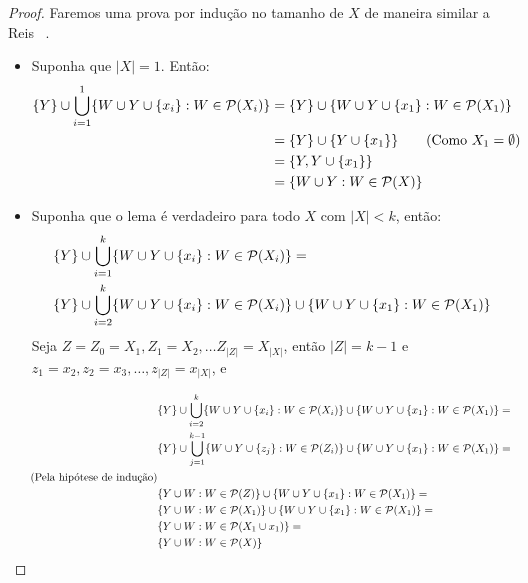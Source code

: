 \begin{proof}
Faremos uma prova por indução no tamanho de $X$ de maneira similar a
Reis ~\cite{Rei12}.

\begin{itemize}
\item{Suponha que $|X| = 1$. Então:}
\begin{align*}
    \{Y\} \cup \bigcup_{i = 1}^{1} \{W \cup Y \cup \{x_i\} : W \in \mathcal{P} (X_i)\} & = 
    \{Y\} \cup \{W \cup Y \cup \{x_1\} : W \in \mathcal{P} (X_1)\} & \\
    & = \{Y\} \cup \{Y \cup \{x_1\}\} \tag{Como $X_1 = \emptyset$} \\
    & = \{Y, Y \cup \{x_1\}\} \\
    & = \{W \cup Y : W \in \mathcal{P} (X)\}
\end{align*}

\item{Suponha que o lema é verdadeiro para todo $X$ com $|X| < k$, 
    então:}
\begin{align*}
    & \{Y\} \cup \bigcup_{i = 1}^{k} \{W \cup Y \cup \{x_i\} : W \in \mathcal{P} (X_i)\} = \\
    & \{Y\} \cup \bigcup_{i = 2}^{k} \{W \cup Y \cup \{x_i\} : W \in \mathcal{P} (X_i)\} \cup \{W \cup Y \cup \{x_1\} : W \in \mathcal{P} (X_1) \}\\
\end{align*}
Seja $Z = Z_0 = X_1, Z_1 = X_2, \dots Z_{|Z|} = X_{|X|}$, então
$|Z| = k - 1$ e $z_1 = x_2, z_2 = x_3, \dots, z_{|Z|} = x_{|X|}$, e
\end{itemize}

\begin{align*}
    & \{Y\} \cup \bigcup_{i = 2}^{k} \{W \cup Y \cup \{x_i\} : W \in \mathcal{P} (X_i)\} \cup \{W \cup Y \cup \{x_1\} : W \in \mathcal{P} (X_1) \} =\\
    & \{Y\} \cup \bigcup_{j = 1}^{k - 1} \{W \cup Y \cup \{z_j\} : W \in \mathcal{P} (Z_i)\} \cup \{W \cup Y \cup \{x_1\} : W \in \mathcal{P} (X_1) \} =\\
    \tag{Pela hipótese de indução}  \\ 
    & \{Y \cup W : W \in \mathcal{P} (Z)\} \cup \{W \cup Y \cup \{x_1\} : W \in \mathcal{P} (X_1) \} =  \\
    & \{Y \cup W : W \in \mathcal{P} (X_1)\} \cup \{W \cup Y \cup \{x_1\} : W \in \mathcal{P} (X_1) \} =  \\
    & \{Y \cup W : W \in \mathcal{P} (X_1 \cup {x_1})\} = \\
    & \{Y \cup W : W \in \mathcal{P} (X)\} \\
\end{align*}
\end{proof}

